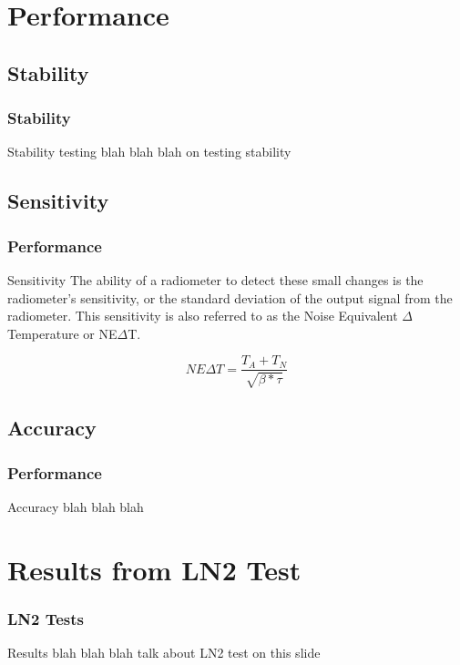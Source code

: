 \documentclass{beamer}
\begin{document}
\section{Performance}
\subsection{Stability}
\begin{frame}
\frametitle{Stability}
\begin{block}{Stability testing}
blah blah blah on testing stability
\end{block}
\end{frame}
\subsection{Sensitivity}
\begin{frame}
\frametitle{Performance}
\begin{block}{Sensitivity}
The ability of a radiometer to detect these small changes is the radiometer's sensitivity, or the standard deviation of the output signal from the radiometer.  This sensitivity is also referred to as the Noise Equivalent $\Delta$ Temperature or NE$\Delta$T. 

\begin{equation}\label{NEAT}
NE\Delta T=\frac{T_{A}+T_{N}}{\sqrt{\beta * \tau}}
\end{equation}
\end{block}
\end{frame}
\subsection{Accuracy}
\begin{frame}
\frametitle{Performance}
\begin{block}{Accuracy}
blah blah blah
\end{block}
\end{frame}


\section{Results from LN2 Test}
\begin{frame}
\frametitle{LN2 Tests}
\begin{block}{Results}
blah blah blah talk about LN2 test on this slide
\end{block}
\end{frame}
\end{document}
